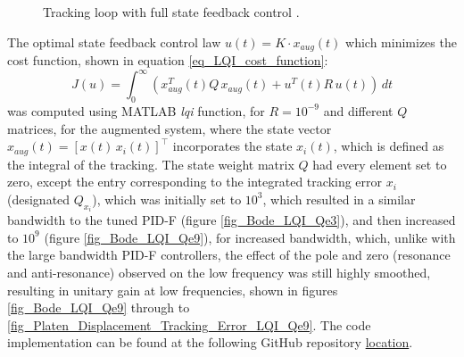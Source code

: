 \documentclass[  10pt, twoside]{report} %
\numberwithin{equation}{chapter}
\begin{document}
\begin{figure}[H]

    \caption{Tracking loop with full state feedback control \citep{mathworks_lqi}.}
    \label{fig_LQI_loop}
\end{figure}

The optimal state feedback control law $u(t) = K \cdot x_{aug}(t)$ which minimizes the cost function, shown in equation \eqref{eq_LQI_cost_function}:
\begin{equation}\label{eq_LQI_cost_function}
     J(u) = \int ^{\infty}_0 (x_{aug}^{T}(t) Q\,x_{aug}(t) + u^{T}(t) R\, u(t))\, dt 
\end{equation} 
was computed using MATLAB \emph{lqi} function, for $R=10^{-9}$ and different $Q$ matrices, for the augmented system, where the state vector $x_{aug}(t) = \left[x(t) \, x_i(t) \right]^\intercal$ incorporates the state $x_i(t)$, which is defined as the integral of the tracking. The state weight matrix $Q$ had every element set to zero, except the entry corresponding to the integrated tracking error $x_i$ (designated $Q_{x_i}$), which was initially set to $10^3$, which resulted in a similar bandwidth to the tuned PID-F (figure \ref{fig_Bode_LQI_Qe3}), and then increased to $10^9$ (figure \ref{fig_Bode_LQI_Qe9}), for increased bandwidth, which, unlike with the large bandwidth PID-F controllers, the effect of the pole and zero (resonance and anti-resonance) observed on the low frequency was still highly smoothed, resulting in unitary gain at low frequencies, shown in figures \ref{fig_Bode_LQI_Qe9} through to \ref{fig_Platen_Displacement_Tracking_Error_LQI_Qe9}. The code implementation can be found at the following GitHub repository \href{https://github.com/c-radicallis/Controlo_Plataforma_Sismica/blob/main/uniaxial_table_model/LQR%20Servo/LQI_servo.m}{location}.
    
\end{document}

